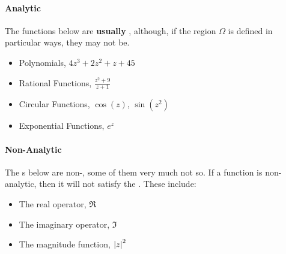 \paragraph{Analytic}\label{par:Analytic_Function_Examples}
The functions below are \textbf{usually} , although, if the region $\Omega$ is defined in particular ways, they may not be.
\begin{itemize}[noitemsep]
\item Polynomials, $4z^{3} + 2z^{2} + z + 45$
\item Rational Functions, $\frac{z^{2} + 9}{z+1}$
\item Circular Functions, $\cos(z)$, $\sin(z^{2})$
\item Exponential Functions, $e^{z}$
\end{itemize}

\paragraph{Non-Analytic}\label{par:NonAnalytic_Function_Examples}
The s below are non-, some of them very much not so.
If a function is non-analytic, then it will not satisfy the .
These include:
\begin{itemize}[noitemsep]
\item The real operator, $\Re$
\item The imaginary operator, $\Im$
\item The magnitude function, ${\lvert z \rvert}^{2}$
\end{itemize}


